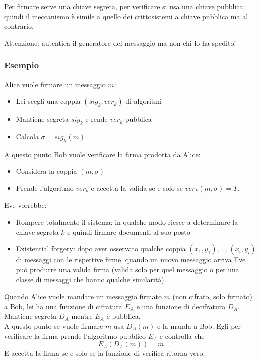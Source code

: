Per firmare serve una chiave segreta, per verificare si usa una chiave pubblica; quindi il meccanismo è simile a quello dei crittosistemi a chiave pubblica ma al contrario.

Attenzione: autentica il generatore del messaggio ma non chi lo ha spedito!

\subsubsection*{Esempio}
Alice vuole firmare un messaggio $m$:
\begin{itemize}
	\item Lei scegli una coppia $(sig_k, ver_k)$ di algoritmi
	\item Mantiene segreta $sig_k$ e rende $ver_k$ pubblica
	\item Calcola $\sigma=sig_k(m)$
\end{itemize}
A questo punto Bob vuole verificare la firma prodotta da Alice:
\begin{itemize}
	\item Considera la coppia $(m, \sigma)$
	\item Prende l'algoritmo $ver_k$ e accetta la valida se e solo se $ver_k(m, \sigma) = T$.
\end{itemize}

Eve vorrebbe:
\begin{itemize}
	\item Rompere totalmente il sistema: in qualche modo riesce a determinare la chiave segreta $k$ e quindi firmare documenti al suo posto
	\item Existential forgery: dopo aver osservato qualche coppia $(x_1, y_1), ..., (x_i, y_i)$ di messaggi con le rispettive firme, quando un nuovo messaggio arriva Eve può produrre una valida firma (valida solo per quel messaggio o per una classe di messaggi che hanno qualche similarità).
\end{itemize}

Quando Alice vuole mandare un messaggio firmato $m$ (non cifrato, solo firmato) a Bob, lei ha una funzione di cifratura $E_A$ e una funzione di decifratura $D_A$. Mantiene segreta $D_A$ mentre $E_A$ è pubblica.\\
A questo punto se vuole firmare $m$ usa $D_A(m)$ e la manda a Bob. Egli per verificare la firma prende l'algoritmo pubblico $E_A$ e controlla che \begin{equation*}
	E_A(D_A(m)) = m
\end{equation*}
E accetta la firma se e solo se la funzione di verifica ritorna vero.

